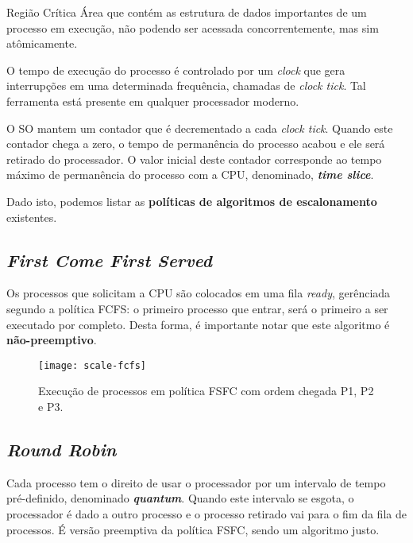 \begin{definicao}{Região Crítica}
  Área que contém as estrutura de dados importantes de um processo em execução, não podendo ser acessada concorrentemente, mas sim atômicamente.
\end{definicao}

O tempo de execução do processo é controlado por um \textit{clock} que gera interrupções em uma determinada frequência, chamadas de \textit{clock tick}. Tal ferramenta está presente em qualquer processador moderno.

O SO mantem um contador que é decrementado a cada \textit{clock tick}. Quando este contador chega a zero, o tempo de permanência do processo acabou e ele será retirado do processador. O valor inicial deste contador corresponde ao tempo máximo de permanência do processo com a CPU, denominado, \textbf{\textit{time slice}}.

Dado isto, podemos listar as \textbf{políticas de algoritmos de escalonamento} existentes.



\subsection{\textit{First Come First Served}}
Os processos que solicitam a CPU são colocados em uma fila \textit{ready}, gerênciada segundo a política FCFS: o primeiro processo que entrar, será o primeiro a ser executado por completo. Desta forma, é importante notar que este algoritmo é \textbf{não-preemptivo}.

\begin{figure}
  \centering
  \texttt{[image: scale-fcfs]}
  \caption{Execução de processos em política FSFC com ordem chegada P1, P2 e P3.}
  \label{fig:scale-fcfs}
\end{figure}





\subsection{\textit{Round Robin}}
Cada processo tem o direito de usar o processador por um intervalo de tempo pré-definido, denominado \textbf{\textit{quantum}}. Quando este intervalo se esgota, o processador é dado a outro processo e o processo retirado vai para o fim da fila de processos. É versão preemptiva da política FSFC, sendo um algoritmo justo.

